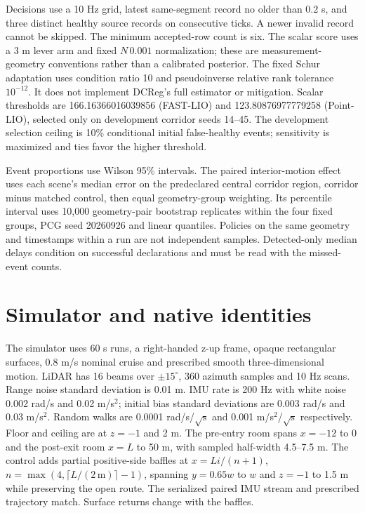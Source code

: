 \documentclass[conference,onecolumn]{IEEEtran}
\begin{document}
Decisions use a 10 Hz grid, latest same-segment record no older than 0.2 s,
and three distinct healthy source records on consecutive ticks. A newer invalid
record cannot be skipped. The minimum accepted-row count is six.
The scalar score uses a 3 m lever arm and fixed $N\,0.001$ normalization;
these are measurement-geometry conventions rather than a calibrated posterior.
The fixed Schur adaptation uses condition ratio 10 and pseudoinverse relative
rank tolerance $10^{-12}$. It does not implement DCReg's full estimator or
mitigation. Scalar thresholds are 166.16366016039856 (FAST-LIO) and
123.80876977779258 (Point-LIO), selected only on development corridor seeds
14--45. The development selection ceiling is 10\% conditional initial
false-healthy events; sensitivity is maximized and ties favor the higher threshold.

Event proportions use Wilson 95\% intervals. The paired interior-motion effect
uses each scene's median error on the predeclared central corridor region,
corridor minus matched control, then equal geometry-group weighting. Its
percentile interval uses 10,000 geometry-pair bootstrap replicates within the
four fixed groups, PCG seed 20260926 and linear quantiles. Policies on the
same geometry and timestamps within a run are not independent samples.
Detected-only median delays condition on successful declarations and must be
read with the missed-event counts.

\section{Simulator and native identities}
The simulator uses 60 s runs, a right-handed z-up frame, opaque rectangular
surfaces, 0.8 m/s nominal cruise and prescribed smooth three-dimensional motion.
LiDAR has 16 beams over $\pm15^\circ$, 360 azimuth samples and 10 Hz scans.
Range noise standard deviation is 0.01 m. IMU rate is 200 Hz with white noise
0.002 rad/s and 0.02 m/s$^2$; initial bias standard deviations are 0.003 rad/s
and 0.03 m/s$^2$. Random walks are 0.0001 rad/s/$\sqrt{\mathrm s}$ and
0.001 m/s$^2$/$\sqrt{\mathrm s}$ respectively. Floor and ceiling are at
$z=-1$ and 2 m. The pre-entry room spans $x=-12$ to 0 and the post-exit
room $x=L$ to 50 m, with sampled half-width 4.5--7.5 m.
The control adds partial positive-side baffles at $x=Li/(n+1)$,
$n=\max(4,\lceil L/(2\,\mathrm m)\rceil-1)$, spanning $y=0.65w$ to $w$ and
$z=-1$ to 1.5 m while preserving the open route. The serialized paired IMU
stream and prescribed trajectory match. Surface returns change with the baffles.
\end{document}
